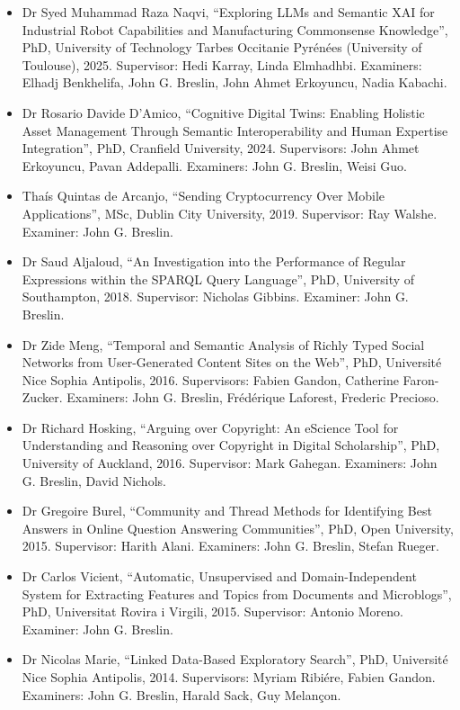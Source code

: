 \documentclass[10pt,a4paper]{res} %
\begin{document}
\begin{resume}
\begin{itemize} \itemsep -2pt
\item Dr Syed Muhammad Raza Naqvi, ``Exploring LLMs and Semantic XAI for Industrial Robot Capabilities and Manufacturing Commonsense Knowledge'', PhD, University of Technology Tarbes Occitanie Pyr\'{e}n\'{e}es (University of Toulouse), 2025. Supervisor: Hedi Karray, Linda Elmhadhbi. Examiners: Elhadj Benkhelifa, John G. Breslin, John Ahmet Erkoyuncu, Nadia Kabachi.
\item Dr Rosario Davide D'Amico, ``Cognitive Digital Twins: Enabling Holistic Asset Management Through Semantic Interoperability and Human Expertise Integration'', PhD, Cranfield University, 2024. Supervisors: John Ahmet Erkoyuncu, Pavan Addepalli. Examiners: John G. Breslin, Weisi Guo. %
\item Tha\'{i}s Quintas de Arcanjo, ``Sending Cryptocurrency Over Mobile Applications'', MSc, Dublin City University, 2019. Supervisor: Ray Walshe. Examiner: John G. Breslin.
\item Dr Saud Aljaloud, ``An Investigation into the Performance of Regular Expressions within the SPARQL Query Language'', PhD, University of Southampton, 2018. Supervisor: Nicholas Gibbins. Examiner: John G. Breslin. %
\item Dr Zide Meng, ``Temporal and Semantic Analysis of Richly Typed Social Networks from User-Generated Content Sites on the Web'', PhD, Universit\'{e} Nice Sophia Antipolis, 2016. Supervisors: Fabien Gandon, Catherine Faron-Zucker. Examiners: John G. Breslin, Fr\'{e}d\'{e}rique Laforest, Frederic Precioso. %
\item Dr Richard Hosking, ``Arguing over Copyright: An eScience Tool for Understanding and Reasoning over Copyright in Digital Scholarship'', PhD, University of Auckland, 2016. Supervisor: Mark Gahegan. Examiners: John G. Breslin, David Nichols.
\item Dr Gregoire Burel, ``Community and Thread Methods for Identifying Best Answers in Online Question Answering Communities'', PhD, Open University, 2015. Supervisor: Harith Alani. Examiners: John G. Breslin, Stefan Rueger. %
\item Dr Carlos Vicient, ``Automatic, Unsupervised and Domain-Independent System for Extracting Features and Topics from Documents and Microblogs'', PhD, Universitat Rovira i Virgili, 2015. Supervisor: Antonio Moreno. Examiner: John G. Breslin.
\item Dr Nicolas Marie, ``Linked Data-Based Exploratory Search'', PhD, Universit\'{e} Nice Sophia Antipolis, 2014. Supervisors: Myriam Ribi\'{e}re, Fabien Gandon. Examiners: John G. Breslin, Harald Sack, Guy Melan\c{c}on.

\end{itemize}
\end{resume}
\end{document}
